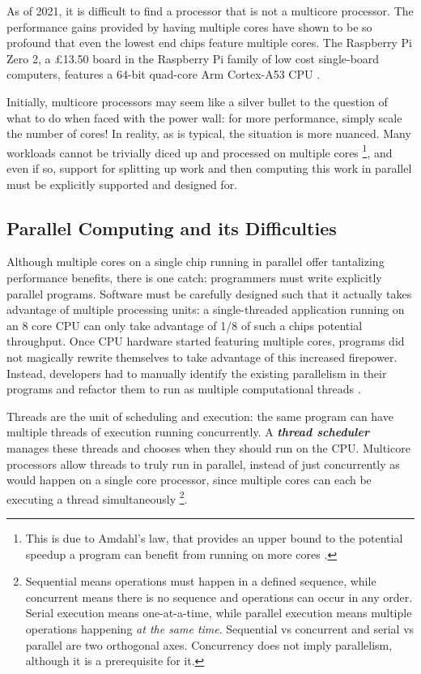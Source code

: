 \documentclass[bsc,frontabs,singlespacing,parskip,deptreport,normalheadings]{infthesis}
\begin{document}
As of 2021, it is difficult to find a processor that is not a multicore
processor. The performance gains provided by having multiple cores have shown to
be so profound that even the lowest end chips feature multiple cores. The
Raspberry Pi Zero 2, a \pounds13.50 board in the Raspberry Pi family of low cost
single-board computers, features a 64-bit quad-core Arm Cortex-A53 CPU
\cite{ltd_raspberry_nodate}.

Initially, multicore processors may seem like a silver bullet to the question of
what to do when faced with the power wall: for more performance, simply scale
the number of cores! In reality, as is typical, the situation is more nuanced.
Many workloads cannot be trivially diced up and processed on multiple cores
\footnote{This is due to Amdahl's law, that provides an upper bound to the
potential speedup a program can benefit from running on more cores
\cite{bryant_computer_2016}.}, and even if so, support for splitting up work and
then computing this work in parallel must be explicitly supported and designed
for.

\subsection{Parallel Computing and its Difficulties}
\label{section:parallel_computing}

Although multiple cores on a single chip running in parallel offer tantalizing
performance benefits, there is one catch: programmers must write explicitly
parallel programs. Software must be carefully designed such that it actually
takes advantage of multiple processing units: a single-threaded application
running on an 8 core CPU can only take advantage of 1/8 of such a chips
potential throughput. Once CPU hardware started featuring multiple cores,
programs did not magically rewrite themselves to take advantage of this
increased firepower. Instead, developers had to manually identify the existing
parallelism in their programs and refactor them to run as multiple computational
threads \cite{patterson_trouble_2010}.

Threads are the unit of scheduling and execution: the same
program can have multiple threads of execution running concurrently. A
\textit{\textbf{thread scheduler}} manages these threads and chooses when they
should run on the CPU. Multicore processors allow threads to truly run in
parallel, instead of just concurrently as would happen on a single core
processor, since multiple cores can each be executing a thread simultaneously
\footnote{Sequential means operations must happen in a defined sequence, while
    concurrent means there is no sequence and operations can occur in any order.
    Serial execution means one-at-a-time, while parallel execution means
    multiple operations happening \textit{at the same time}. Sequential vs
concurrent and serial vs parallel are two orthogonal axes. Concurrency does not
imply parallelism, although it is a prerequisite for it.}.
\end{document}
